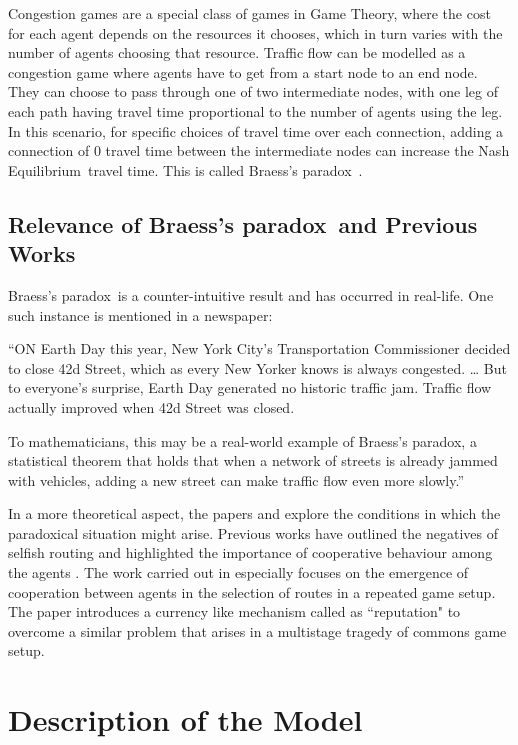 \documentclass[11pt, letterpaper]{article}
\newcommand{\bp}{Braess's paradox}
\newcommand{\NE}{Nash Equilibrium}
\begin{document}
Congestion games are a special class of games in Game Theory, where the cost for each agent depends on the resources it chooses, which in turn varies with the number of agents choosing that resource. Traffic flow can be modelled as a congestion game where agents have to get from a start node to an end node. They can choose to pass through one of two intermediate nodes, with one leg of each path having travel time proportional to the number of agents using the leg. In this scenario, for specific choices of travel time over each connection, adding a connection of 0 travel time between the intermediate nodes can increase the \NE~travel time. This is called \bp~\cite{braess}.

\subsection{Relevance of \bp~and Previous Works}
\bp~is a counter-intuitive result and has occurred in real-life. One such instance is mentioned in a newspaper:

``ON Earth Day this year, New York City's Transportation Commissioner decided to close 42d Street, which as every New Yorker knows is always congested. \ldots 
But to everyone's surprise, Earth Day generated no historic traffic jam. Traffic flow actually improved when 42d Street was closed.

To mathematicians, this may be a real-world example of Braess's paradox, a statistical theorem that holds that when a network of streets is already jammed with vehicles, adding a new street can make traffic flow even more slowly.''\cite{nytimes} 

In a more theoretical aspect, the papers  \cite{braessexistence} and \cite{PAS1997265} explore the conditions in which the paradoxical situation might arise. Previous works have outlined the negatives of selfish routing and highlighted the importance of cooperative behaviour among the agents \cite{selfishrouting}. The work carried out in \cite{helbing2005individuals} especially focuses on the emergence of cooperation between agents in the selection of routes in a repeated game setup. The paper \cite{milinski2002reputation} introduces a currency like mechanism called as ``reputation" to overcome a similar problem that arises in a multistage tragedy of commons game setup.

\section{Description of the Model}
\end{document}
